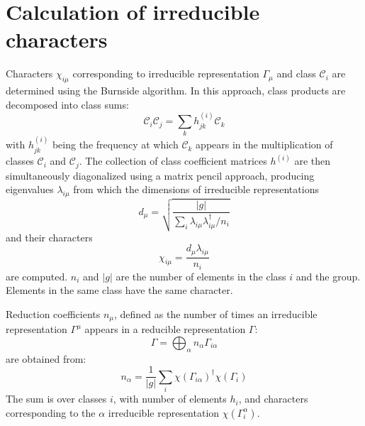 \documentclass[twocolumn,showpacs,preprintnumbers,superscriptaddress,prb,floatfix,aps,10pt]{revtex4-1}
\newcommand*{\class}{\mathcal{C}}
\begin{document}
\section{Calculation of irreducible characters}
\label{appendix:chartab}
Characters $\chi_{i\mu}$ corresponding to irreducible representation $\Gamma_\mu$ and class $\class_i$ are determined using the Burnside algorithm.\cite{burnside_theory_2010,mckay_construction_1970,unger_computing_2006,schneider_dixons_1990,dixon_high_1967} In this approach, class products are decomposed into class sums:
\begin{equation}
\label{eq:class_coefficients}
\class_i \class_j = \sum_k h_{jk}^{(i)} \class_k
\end{equation}
with $h_{jk}^{(i)}$ being the frequency at which $\class_k$ appears in the multiplication of classes $\class_i$ and $\class_j$. The collection of class coefficient matrices $h^{(i)}$ are then simultaneously diagonalized using a matrix pencil approach, producing eigenvalues $\lambda_{i\mu}$ from which the dimensions of irreducible representations
\begin{equation}
\label{eq:irrep_dimension}
d_\mu = \sqrt{ \frac{|g|}{\sum_i \lambda_{i\mu} \lambda^{\dag}_{i\mu} / n_i }  }
\end{equation}
and their characters
\begin{equation}
\label{eq:irrep_characters}
\chi_{i\mu} = \frac{d_\mu \lambda_{i\mu}}{n_i}
\end{equation}
are computed. $n_i$ and $|g|$ are the number of elements in the class $i$ and the group. Elements in the same class have the same character.

Reduction coefficients $n_\mu$, defined as the number of times an irreducible representation $\Gamma^\mu$ appears in a reducible representation $\Gamma$:
\begin{equation}
\label{eq:irrep_decomposition}
\Gamma = \bigoplus_\alpha n_\alpha \Gamma_{i\alpha}
\end{equation}
are obtained from:
\begin{equation}
\label{eq:irrep_decomposition_coefficients}
n_\alpha = \frac{1}{|g|} \sum_i \chi\left(\Gamma_{i\alpha}\right)^\dag \chi\left(\Gamma_i\right)
\end{equation}
The sum is over classes $i$, with number of elements $h_i$, and characters corresponding to the $\alpha$ irreducible representation $\chi(\Gamma_i^\alpha)$.





%
%
%
\end{document}
